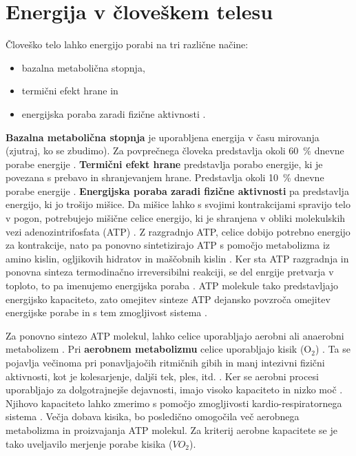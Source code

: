 \section{Energija v človeškem telesu}\label{sec:energija}
Človeško telo lahko energijo porabi na tri različne načine:

\begin{itemize}
\item bazalna metabolična stopnja,
\item termični efekt hrane in
\item energijska poraba zaradi fizične aktivnosti \cite{levine2005measurement}.
\end{itemize}

\textbf{Bazalna metabolična stopnja} je uporabljena energija v času mirovanja (zjutraj, ko se zbudimo). Za povprečnega človeka predstavlja okoli \SI{60}{\%} dnevne porabe energije \cite{levine2005measurement}. \textbf{Termični efekt hrane} predstavlja porabo energije, ki je povezana s prebavo in shranjevanjem hrane. Predstavlja okoli \SI{10}{\%} dnevne porabe energije \cite{levine2005measurement}. \textbf{Energijska poraba zaradi fizične aktivnosti} pa predstavlja energijo, ki jo trošijo mišice. Da mišice lahko s svojimi kontrakcijami spravijo telo v pogon, potrebujejo mišične celice energijo, ki je shranjena v obliki molekulskih vezi adenozintrifosfata (ATP) \cite{scott2005misconceptions}. Z razgradnjo ATP, celice dobijo potrebno energijo za kontrakcije, nato pa ponovno sintetizirajo ATP s pomočjo metabolizma iz amino kislin, ogljikovih hidratov in maščobnih kislin \cite{scott2005misconceptions,patel2017aerobic}. Ker sta ATP razgradnja in ponovna sinteza termodinačno irreversibilni reakciji, se del enrgije pretvarja v toploto, to pa imenujemo energijska poraba \cite{scott2005misconceptions}. ATP molekule tako predstavljajo energijsko kapaciteto, zato omejitev sinteze ATP dejansko povzroča omejitev energijske porabe in s tem zmogljivost sistema \cite{sahlin1998energy}. 

Za ponovno sintezo ATP molekul, lahko celice uporabljajo aerobni ali anaerobni metabolizem \cite{scott2005misconceptions}. Pri \textbf{aerobnem metabolizmu} celice uporabljajo kisik ($\mathrm{O}_2$) \cite{patel2017aerobic}. Ta se pojavlja večinoma pri ponavljajočih ritmičnih gibih in manj intezivni fizični aktivnosti, kot je kolesarjenje, daljši tek, ples, itd. \cite{patel2017aerobic}. Ker se aerobni procesi uporabljajo za dolgotrajnejše dejavnosti, imajo visoko kapaciteto in nizko moč \cite{sahlin1998energy}. Njihovo kapaciteto lahko zmerimo s pomočjo zmogljivosti kardio-respiratornega sistema \cite{patel2017aerobic}. Večja dobava kisika, bo posledično omogočila več aerobnega metabolizma in proizvajanja ATP molekul. Za kriterij aerobne kapacitete se je tako uveljavilo merjenje porabe kisika (${VO}_2$).

